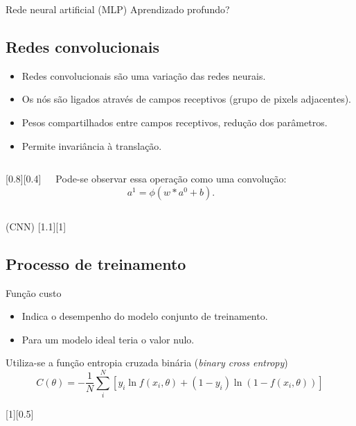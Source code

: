 \begin{frame}{Rede neural artificial (MLP)}
	\pause
	\vspace{-30pt}
	\center Aprendizado profundo?
\end{frame}

\subsection{Redes convolucionais}
\begin{frame}{\insertsubsection}
	\begin{itemize}
	\item Redes convolucionais são uma variação das redes neurais.
	\item Os nós são ligados através de campos receptivos (grupo de pixels adjacentes).
	\item Pesos compartilhados entre campos receptivos, redução dos parâmetros.
	\item Permite invariância à translação.
	\end{itemize}

	\begin{columns}
		[0.8][0.4]

		Pode-se observar essa operação como uma convolução:
		\begin{equation*}
		a^1 = \phi(w \ast a^0 + b).
		\end{equation*}

	\end{columns}
	
\end{frame}

\begin{frame}{\insertsubsection (CNN)}
	[1.1][1]
\end{frame}

\subsection{Processo de treinamento}

\begin{frame}{Função custo}
	\begin{itemize}
	\item Indica o desempenho do modelo conjunto de treinamento.
	\item Para um modelo ideal teria o valor nulo.
	\end{itemize}

	\pause

	Utiliza-se a função entropia cruzada binária (\textit{binary cross entropy})
	\begin{equation*}
	C(\theta) = -\frac{1}{N} \sum_i^N \left[y_i \ln f(x_i,\theta) + (1-y_i) \ln (1-f(x_i,\theta))\right]
	\end{equation*}

	[0.5]
\end{frame}

